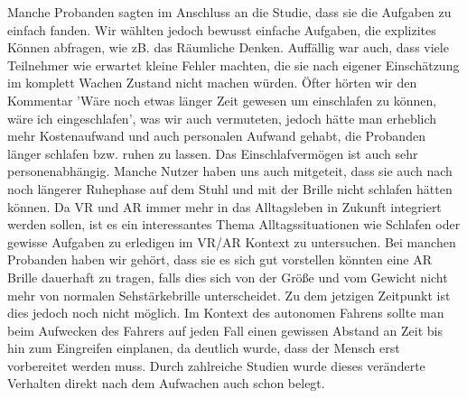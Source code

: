 Manche Probanden sagten im Anschluss an die Studie, dass sie die Aufgaben zu einfach fanden. Wir wählten jedoch bewusst einfache Aufgaben, die explizites Können abfragen, wie zB. das Räumliche Denken. Auffällig war auch, dass viele Teilnehmer wie erwartet kleine Fehler machten, die sie nach eigener Einschätzung im komplett Wachen Zustand nicht machen würden. 
Öfter hörten wir den Kommentar 'Wäre noch etwas länger Zeit gewesen um einschlafen zu können, wäre ich eingeschlafen', was wir auch  vermuteten, jedoch hätte man erheblich mehr Kostenaufwand und auch personalen Aufwand gehabt, die Probanden länger schlafen bzw. ruhen zu lassen. Das Einschlafvermögen ist auch sehr personenabhängig. Manche Nutzer haben uns auch mitgeteit, dass sie auch nach noch längerer Ruhephase auf dem Stuhl und mit der Brille nicht schlafen hätten können. 
Da VR und AR immer mehr in das Alltagsleben in Zukunft integriert werden sollen, ist es ein interessantes Thema Alltagssituationen wie Schlafen oder gewisse Aufgaben zu erledigen im VR/AR Kontext zu untersuchen. Bei manchen Probanden haben wir gehört, dass sie es sich gut vorstellen könnten eine AR Brille dauerhaft zu tragen, falls dies sich von der Größe und vom Gewicht nicht mehr von normalen Sehstärkebrille unterscheidet. Zu dem jetzigen Zeitpunkt ist dies jedoch noch nicht möglich.
Im Kontext des autonomen Fahrens sollte man beim Aufwecken des Fahrers auf jeden Fall einen gewissen Abstand an Zeit bis hin zum Eingreifen einplanen, da deutlich wurde, dass der Mensch erst vorbereitet werden muss. Durch zahlreiche Studien wurde dieses veränderte Verhalten direkt nach dem Aufwachen auch schon belegt.

